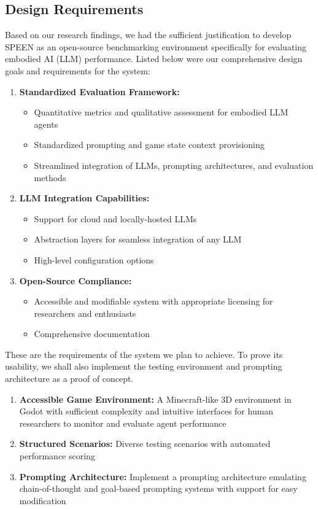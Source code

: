 \documentclass{article}
\begin{document}

\subsection{Design Requirements}
Based on our research findings, we had the sufficient justification to develop SPEEN as an open-source benchmarking environment specifically for evaluating embodied AI (LLM) performance.
Listed below were our comprehensive design goals and requirements for the system:
\begin{enumerate}
    \item \textbf{Standardized Evaluation Framework:}
          \begin{itemize}
              \item Quantitative metrics and qualitative assessment for embodied LLM agents
              \item Standardized prompting and game state context provisioning
              \item Streamlined integration of LLMs, prompting architectures, and evaluation methods
          \end{itemize}
    \item \textbf{LLM Integration Capabilities:}
          \begin{itemize}
              \item Support for cloud and locally-hosted LLMs
              \item Abstraction layers for seamless integration of any LLM
              \item High-level configuration options
          \end{itemize}
    \item \textbf{Open-Source Compliance:}
          \begin{itemize}
              \item Accessible and modifiable system with appropriate licensing for researchers and enthusiasts
              \item Comprehensive documentation
          \end{itemize}
\end{enumerate}
These are the requirements of the system we plan to achieve.
To prove its usability, we shall also implement the testing environment and prompting architecture as a proof of concept.
\begin{enumerate}
    \item \textbf{Accessible Game Environment:} A Minecraft-like 3D environment in Godot with sufficient complexity and intuitive interfaces for human researchers to monitor and evaluate agent performance
    \item \textbf{Structured Scenarios:} Diverse testing scenarios with automated performance scoring
    \item \textbf{Prompting Architecture:} Implement a prompting architecture emulating chain-of-thought and goal-based prompting systems with support for easy modification
\end{enumerate}
\end{document}
